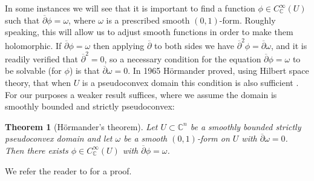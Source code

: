 \documentclass[11pt,a4paper, final, twoside]{article}
\newtheorem{theorem}{Theorem}
\numberwithin{equation}{section}
\newcommand{\C}{\mathbb C}
\newcommand{\con}[1]{\overline{#1}}
\newcommand{\ccts}{C_{\mathbb C}}
\begin{document}
In some instances we will see that it is important to find a function $\phi\in\ccts^\infty(U)$ such that $\con\partial\phi=\omega$, where $\omega$ is a prescribed smooth $(0,1)$-form. Roughly speaking,
this will allow us to adjust smooth functions in order to make them holomorphic. If $\con\partial\phi=\omega$ then applying $\con\partial$ to both sides we have $\con\partial^2\phi=\con\partial\omega$,
and it is readily verified that $\con\partial^2=0$, so a necessary condition for the equation $\con\partial\phi=\omega$ to be solvable (for $\phi$) is that $\con\partial\omega=0$.
In 1965 H\"ormander proved, using Hilbert space theory,
that when $U$ is a pseudoconvex domain this condition is also sufficient \cite{hormander}. For our purposes a weaker result suffices, where we assume the domain is smoothly bounded and strictly pseudoconvex:
\begin{theorem}[H\"ormander's theorem]
\label{hormander}
Let $U\subset\C^n$ be a smoothly bounded strictly pseudoconvex domain and let $\omega$ be a smooth $(0,1)$-form on $U$ with $\con\partial \omega=0$. Then there exists
$\phi\in\ccts^\infty(U)$ with $\con\partial \phi=\omega$.
\end{theorem}
We refer the reader to \cite[chapter 4]{krantz} for a proof.
\end{document}
